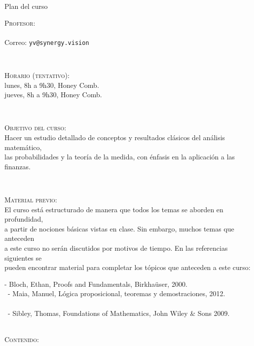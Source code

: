 \documentclass[12pt,letterpaper]{article}
\newcommand\tab[1][1.5cm]{\hspace*{#1}}
\begin{document}
\begin{center}
\Large\sc
Plan del curso\\
\end{center}

\bigskip

\textsc{Profesor}: \\
\tab {\sc Yannic VARGAS.}\\
\tab Correo: \texttt{yv@synergy.vision}

\

\textsc{Horario (tentativo)}: \\
\tab lunes, 8h a 9h30, Honey Comb. \\
\tab jueves, 8h a 9h30, Honey Comb.

\

\textsc{Objetivo del curso}: \\
\tab Hacer un estudio detallado de conceptos y resultados clásicos del análisis matemático, \\
\tab las probabilidades y la teoría de la medida, con énfasis en la aplicación a las finanzas.

\

\textsc{Material previo}: \\
\tab El curso está estructurado de manera que todos los temas se aborden en profundidad,\\
\tab a partir de nociones básicas vistas en clase. Sin embargo, muchos temas que anteceden \\
\tab a este curso no serán discutidos por motivos de tiempo. En las referencias siguientes se \\
\tab pueden encontrar material para completar los tópicos que anteceden a este curso:

\medskip

\tab - Bloch, Ethan, Proofs and Fundamentals, Birkha\"{u}ser, 2000.\\
\tab \  \quad - Maia, Manuel, Lógica proposicional, teoremas y demostraciones, 2012. \\
\tab {}\\
\tab \quad \ - Sibley, Thomas, Foundations of Mathematics, John Wiley \& Sons 2009.\\

\

\textsc{Contenido}: \\
\end{document}
